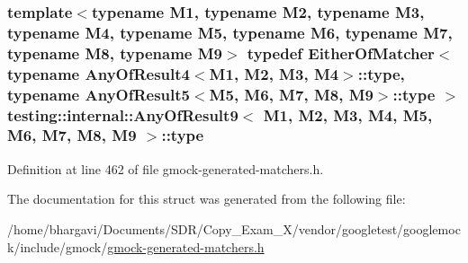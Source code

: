 \subsubsection[{\texorpdfstring{type}{type}}]{\setlength{\rightskip}{0pt plus 5cm}template$<$typename M1, typename M2, typename M3, typename M4, typename M5, typename M6, typename M7, typename M8, typename M9$>$ typedef {\bf Either\+Of\+Matcher}$<$ typename {\bf Any\+Of\+Result4}$<$M1, M2, M3, M4$>$\+::{\bf type}, typename {\bf Any\+Of\+Result5}$<$M5, M6, M7, M8, M9$>$\+::{\bf type} $>$ {\bf testing\+::internal\+::\+Any\+Of\+Result9}$<$ M1, M2, M3, M4, M5, M6, M7, M8, M9 $>$\+::{\bf type}}\hypertarget{structtesting_1_1internal_1_1_any_of_result9_a308935fb02c62f502044dcc7b0a2b464}{}\label{structtesting_1_1internal_1_1_any_of_result9_a308935fb02c62f502044dcc7b0a2b464}


Definition at line 462 of file gmock-\/generated-\/matchers.\+h.



The documentation for this struct was generated from the following file\+:\begin{DoxyCompactItemize}
\item 
/home/bhargavi/\+Documents/\+S\+D\+R/\+Copy\+\_\+\+Exam\+\_\+X/vendor/googletest/googlemock/include/gmock/\hyperlink{gmock-generated-matchers_8h}{gmock-\/generated-\/matchers.\+h}\end{DoxyCompactItemize}
